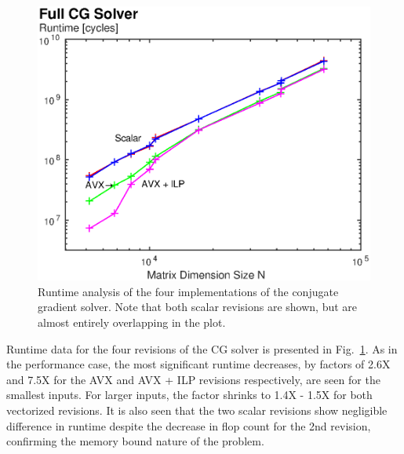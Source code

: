 \documentclass[letterpaper]{article}
\begin{document}
\begin{figure}\centering
  \includegraphics[scale=0.67]{./plots/runtime_solver.eps}
  \caption{Runtime analysis of the four implementations of the
  conjugate gradient solver. Note that both scalar revisions are shown, but are almost entirely overlapping in the plot.\label{runtime_solver}}
\end{figure}

Runtime data for the four revisions of the CG solver is presented in Fig.~\ref{runtime_solver}. As in the performance case, the most significant runtime decreases, by factors of 2.6X and 7.5X for the AVX and AVX + ILP revisions respectively, are seen for the smallest inputs. For larger inputs, the factor shrinks to 1.4X - 1.5X for both vectorized revisions. It is also seen that the two scalar revisions show negligible difference in runtime despite the decrease in flop count for the 2nd revision, confirming the memory bound nature of the problem. 
\end{document}
